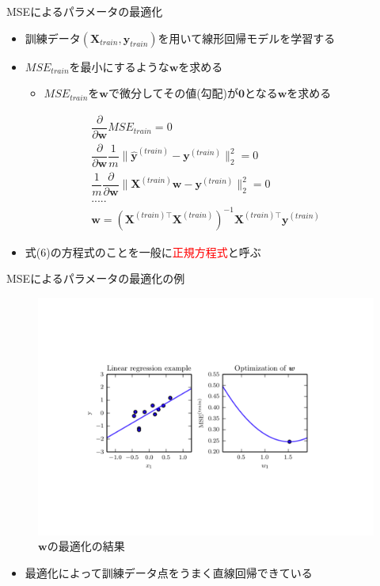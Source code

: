 \documentclass[dvipdfmx, 10pt]{beamer}
\begin{document}

\begin{frame}{MSEによるパラメータの最適化}
  \begin{itemize}
    \item 訓練データ$(\bm{X}_{train}, \bm{y}_{train})$を用いて線形回帰モデルを学習する
    \item $MSE_{train}$を最小にするような$\bm{w}$を求める
    \begin{itemize}
      \item $MSE_{train}$を$\bm{w}$で微分してその値(勾配)が$\bm{0}$となる$\bm{w}$を求める
    \end{itemize}
  \end{itemize}
  \begin{gather}
    \dfrac{\partial} {\partial \bm{w}} MSE_{train} = 0 \\
    \dfrac{\partial} {\partial \bm{w}} \dfrac{1} {m}\| \hat{\bm{y}} ^ {(train)} - \bm{y} ^ {(train)} \| _{2}^{2} = 0 \\
    \dfrac{1} {m} \dfrac{\partial} {\partial \bm{w}} \| \bm{X}^{(train)} \bm{w} - \bm{y} ^ {(train)} \| _{2}^{2} = 0 \\
    ..... \nonumber \\ 
    \bm{w} = (\bm{X} ^ {(train)\top} \bm{X} ^ {(train)}) ^ {-1} \bm{X} ^ {(train)\top} \bm{y} ^ {(train)}
  \end{gather}
  \begin{itemize}
    \item 式(6)の方程式のことを一般に\textcolor{red}{正規方程式}と呼ぶ
  \end{itemize}
\end{frame}


\begin{frame}{MSEによるパラメータの最適化の例}
  \begin{figure}[htbp]
     \includegraphics[keepaspectratio, scale=0.4, angle=-90]{./images/mse-opt.pdf}
     \caption{$\bm{w}$の最適化の結果}
  \end{figure}
  \begin{itemize}
    \item 最適化によって訓練データ点をうまく直線回帰できている
  \end{itemize}
\end{frame}
\end{document}
